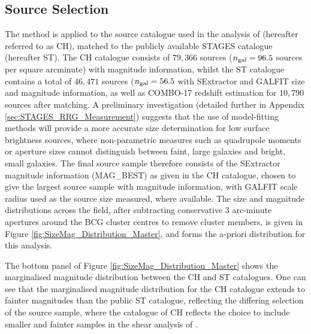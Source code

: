 \documentclass[useAMS,usenatbib,times,letter,amssymb]{mn2e}
\begin{document}
\subsection{Source Selection}\label{sec:Source_Selection}

The method is applied to the source catalogue used in the analysis of \cite{Heymans:2008p2060} (hereafter referred to as CH), matched to the publicly available STAGES catalogue \cite{Gray:2009p2720} (hereafter ST). The CH catalogue consists of $79,366$ sources ($n_{\rm gal} = 96.5$ sources per square arcminute) with magnitude information, whilst the ST catalogue contains a total of $46,471$ sources ($n_{\rm gal} = 56.5$ with SExtractor and GALFIT size and magnitude information, as well as COMBO-17 redshift estimation for $10,790$ sources after matching. A preliminary investigation (detailed further in Appendix \ref{sec:STAGES_RRG_Measurement}) suggests that the use of model-fitting methods will provide a more accurate size determination for low surface brightness sources, where non-parametric measures such as quadrupole moments or aperture sizes cannot distinguish between faint, large galaxies and bright, small galaxies. The final source sample therefore consists of the SExtractor magnitude information (MAG\_BEST) as given in the CH catalogue, chosen to give the largest source sample with magnitude information, with GALFIT scale radius used as the source size measured, where available. The size and magnitude distributions across the field, after subtracting conservative $3$ arc-minute apertures around the BCG cluster centres to remove cluster members, is given in Figure \ref{fig:SizeMag_Distribution_Master}, and forms the a-priori distribution for this analysis.

The bottom panel of Figure \ref{fig:SizeMag_Distribution_Master} shows the marginalised magnitude distribution between the CH and ST catalogues. One can see that the marginalised magnitude distribution for the CH catalogue extends to fainter magnitudes than the public ST catalogue, reflecting the differing selection of the source sample, where the catalogue of CH reflects the choice to include smaller and fainter samples in the shear analysis of \cite{Heymans:2008p2060}.
\end{document}
